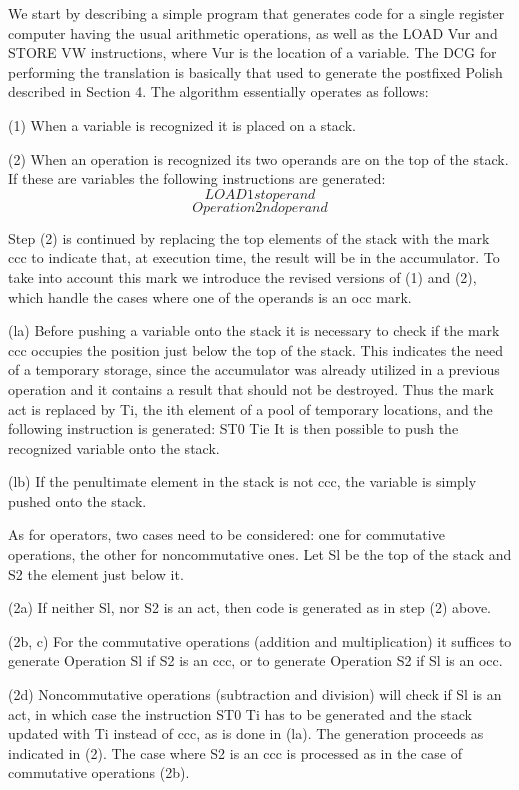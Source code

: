 \label{cohen7}\secdown


We start by describing a simple program that generates code for a single register
computer having the usual arithmetic operations, as well as the LOAD Vur and
STORE VW instructions, where Vur is the location of a variable. The DCG for
performing the translation is basically that used to generate the postfixed Polish
described in Section 4. The algorithm essentially operates as follows:

(1) When a variable is recognized it is placed on a stack.

(2) When an operation is recognized its two operands are on the top of the stack.
If these are variables the following instructions are generated:
\[LOAD 1st operand\]
\[Operation 2nd operand\]

Step (2) is continued by replacing the top elements of the stack with the mark
ccc to indicate that, at execution time, the result will be in the accumulator. To
take into account this mark we introduce the revised versions of (1) and (2),
which handle the cases where one of the operands is an occ mark.

(la) Before pushing a variable onto the stack it is necessary to check if the mark
ccc occupies the position just below the top of the stack. This indicates the
need of a temporary storage, since the accumulator was already utilized in
a previous operation and it contains a result that should not be destroyed.
Thus the mark act is replaced by Ti, the ith element of a pool of temporary
locations, and the following instruction is generated: ST0 Tie It is then
possible to push the recognized variable onto the stack.

(lb) If the penultimate element in the stack is not ccc, the variable is simply
pushed onto the stack.  

As for operators, two cases need to be considered: one for commutative
operations, the other for noncommutative ones. Let Sl be the top of the stack
and S2 the element just below it.

(2a) If neither Sl, nor S2 is an act, then code is generated as in step (2) above.

(2b, c) For the commutative operations (addition and multiplication) it suffices
to generate
Operation Sl if S2 is an ccc, or to generate
Operation S2 if Sl is an occ.

(2d) Noncommutative operations (subtraction and division) will check if Sl
is an act, in which case the instruction ST0 Ti has to be generated and
the stack updated with Ti instead of ccc, as is done in (la). The generation
proceeds as indicated in (2). The case where S2 is an ccc is processed as
in the case of commutative operations (2b).

